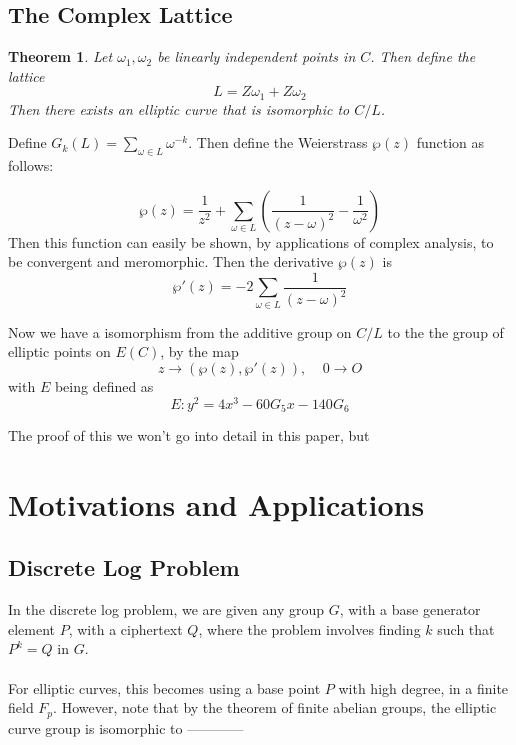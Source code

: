 \documentclass[12pt,twoside]{article}
\newtheorem{theorem}{Theorem}
\begin{document}
\subsection{The Complex Lattice}
\begin{theorem} 
Let $\omega_{1}, \omega_{2}$ be linearly independent points in $C$. Then define the lattice 
$$ L = Z\omega_{1} + Z \omega_{2}$$ Then there exists an elliptic curve that is isomorphic to $C/ L$. 
\end{theorem}
Define $G_{k}(L) = \sum_{\omega \in L}\omega^{-k}$. Then define the Weierstrass $\wp (z) $ function as follows: 

\begin{equation} 
\wp(z) = \frac{1}{z^{2}} + \sum_{\omega \in L}\left(\frac{1}{(z-\omega)^{2}} - \frac{1}{\omega^{2}}\right) 
\end{equation}  
Then this function can easily be shown, by applications of complex analysis, to be convergent and meromorphic. Then the derivative $\wp(z)$ is 
\begin{equation} 
\wp ' (z) = -2 \sum_{\omega \in L} \frac{1}{(z- \omega)^{2}} 
\end{equation} 

Now we have a isomorphism from the additive group on $C/L$ to the the group of elliptic points on $E(C)$, by the map $$z \rightarrow ( \wp(z), \wp' (z)), \> \> \> \> \> 0 \rightarrow O $$ with $E$ being defined as 
\begin{equation} 
E: y^{2} = 4x^{3} - 60G_{5}x - 140G_{6} 
\end{equation} 

The proof of this we won't go into detail in this paper, but 
\section{Motivations and Applications} 

\subsection{Discrete Log Problem}
In the discrete log problem, we are given any group $G$, with a base generator element $P$, with a ciphertext $Q$, where the problem involves finding $k$ such that $P^{k} = Q$ in $G$. \\ \\
For elliptic curves, this becomes using a base point $P$ with high degree, in a finite field $F_{p}$. However, note that by the theorem of finite abelian groups, the elliptic curve group is isomorphic to ------------
\end{document}
